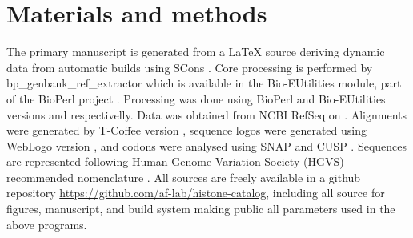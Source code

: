 \section{Materials and methods}
\label{sec:matmethods}

  The primary manuscript is generated from a \LaTeX{} source
  deriving dynamic data from automatic builds using SCons \citep{SCons2005}.
  Core processing is performed by bp\_genbank\_ref\_extractor
  which is available in the Bio-EUtilities module, part of the
  BioPerl project \citep{bioperl}.
  Processing was done using BioPerl and Bio-EUtilities versions
  \BioPerlVersion{} and \BioEUtilitiesVersion{} respectivelly.
  Data was obtained from NCBI RefSeq on \SequencesDate{} \citep{PruittRefseq2014}.
  Alignments were generated by T-Coffee version
  \TCoffeVersion{} \citep{tcoffee2000},
  sequence logos were generated using WebLogo version
   \citep{weblogo},
  and codons were analysed using SNAP  \citep{KorberSNAP2000}
  and CUSP  \citep{Emboss2000}.
  Sequences are represented following Human Genome Variation
  Society (HGVS) recommended nomenclature \citep{mutnomenclature2003}.
  All sources are freely available in a github repository
  \url{https://github.com/af-lab/histone-catalog}, including all
  source for figures, manuscript, and build system making public
  all parameters used in the above programs.
